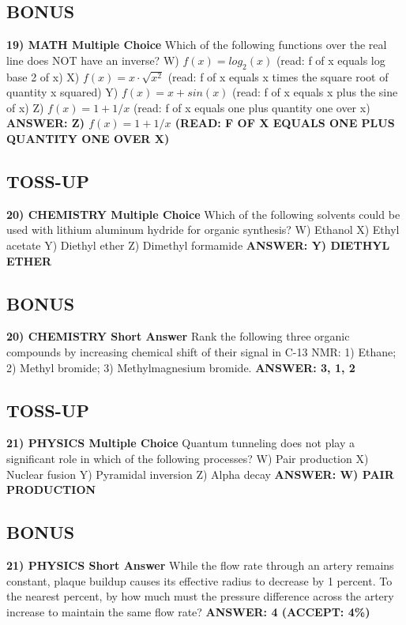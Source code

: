 \documentclass{article}
\begin{document}
\subsection*{BONUS}
\textbf{19) MATH Multiple Choice} Which of the following functions over the real line does NOT have an inverse?
W) $f(x)=log_{2}(x)$ (read: f of x equals log base 2 of x)
X) $f(x)=x\cdot\sqrt{x^{2}}$ (read: f of x equals x times the square root of quantity x squared)
Y) $f(x)=x+sin(x)$ (read: f of x equals x plus the sine of x)
Z) $f(x)=1+1/x$ (read: f of x equals one plus quantity one over x)
\textbf{ANSWER: Z) $f(x)=1+1/x$ (READ: F OF X EQUALS ONE PLUS QUANTITY ONE OVER X)}

\newpage

\subsection*{TOSS-UP}
\textbf{20) CHEMISTRY Multiple Choice} Which of the following solvents could be used with lithium aluminum hydride for organic synthesis?
W) Ethanol
X) Ethyl acetate
Y) Diethyl ether
Z) Dimethyl formamide
\textbf{ANSWER: Y) DIETHYL ETHER}

\subsection*{BONUS}
\textbf{20) CHEMISTRY Short Answer} Rank the following three organic compounds by increasing chemical shift of their signal in C-13 NMR: 1) Ethane; 2) Methyl bromide; 3) Methylmagnesium bromide.
\textbf{ANSWER: 3, 1, 2}

\subsection*{TOSS-UP}
\textbf{21) PHYSICS Multiple Choice} Quantum tunneling does not play a significant role in which of the following processes?
W) Pair production
X) Nuclear fusion
Y) Pyramidal inversion
Z) Alpha decay
\textbf{ANSWER: W) PAIR PRODUCTION}

\subsection*{BONUS}
\textbf{21) PHYSICS Short Answer} While the flow rate through an artery remains constant, plaque buildup causes its effective radius to decrease by 1 percent. To the nearest percent, by how much must the pressure difference across the artery increase to maintain the same flow rate?
\textbf{ANSWER: 4 (ACCEPT: 4\%)}
\end{document}
